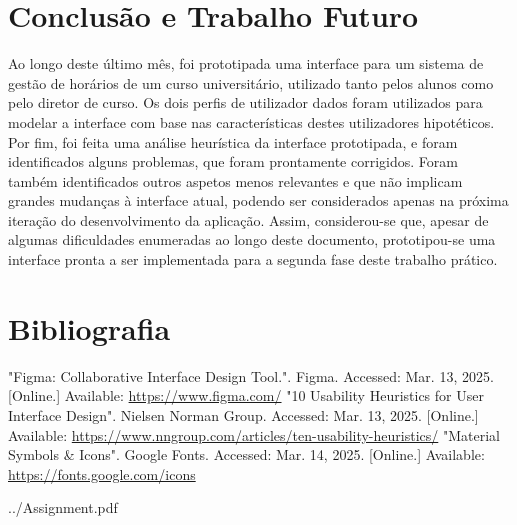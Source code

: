 \documentclass[12pt, a4paper]{article}
\begin{document}
\section{Conclusão e Trabalho Futuro}

Ao longo deste último mês, foi prototipada uma interface para um sistema de gestão de horários de um
curso universitário, utilizado tanto pelos alunos como pelo diretor de curso. Os dois perfis de
utilizador dados foram utilizados para modelar a interface com base nas características destes
utilizadores hipotéticos. Por fim, foi feita uma análise heurística da interface prototipada, e
foram identificados alguns problemas, que foram prontamente corrigidos. Foram também identificados
outros aspetos menos relevantes e que não implicam grandes mudanças à interface atual, podendo ser
considerados apenas na próxima iteração do desenvolvimento da aplicação. Assim, considerou-se que,
apesar de algumas dificuldades enumeradas ao longo deste documento, prototipou-se uma interface
pronta a ser implementada para a segunda fase deste trabalho prático.

\begingroup
\section{Bibliografia}
\renewcommand{\section}[2]{}

\begin{thebibliography}{9}
        "Figma: Collaborative Interface Design Tool."{}. Figma. Accessed: Mar. 13, 2025. [Online.]
        Available: \url{https://www.figma.com/}
        "10 Usability Heuristics for User Interface Design". Nielsen Norman Group.
        Accessed: Mar. 13, 2025. [Online.] Available:
        \url{https://www.nngroup.com/articles/ten-usability-heuristics/}
        "Material Symbols \& Icons"{}. Google Fonts. Accessed: Mar. 14, 2025. [Online.] Available:
        \url{https://fonts.google.com/icons}
\end{thebibliography}
\endgroup


    {../Assignment.pdf}

\end{document}
